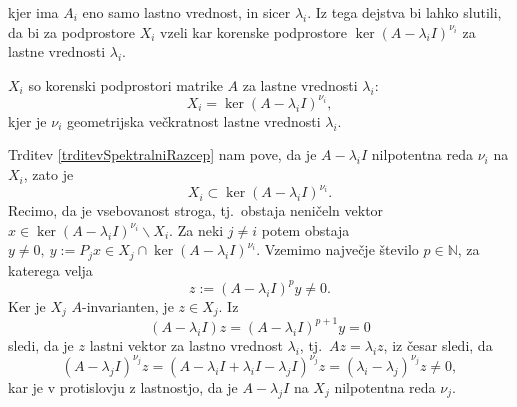 \documentclass[mat1]{fmfdelo}
\newcommand{\N}{\mathbb N}
\begin{document}
kjer ima $A_i$ eno samo lastno vrednost, in sicer $\lambda_i$. Iz tega dejstva bi lahko slutili, da bi za podprostore $X_i$ vzeli kar korenske podprostore $\ker (A - \lambda_i I)^{\nu_i}$ za lastne vrednosti $\lambda_i$.
\begin{trditev}
    $X_i$ so korenski podprostori matrike $A$ za lastne vrednosti $\lambda_i$:
    \begin{equation*}
        X_i = \ker (A - \lambda_i I)^{\nu_i},
    \end{equation*}
    kjer je $\nu_i$ geometrijska večkratnost lastne vrednosti $\lambda_i$.
\end{trditev}
\begin{dokaz}
    Trditev \ref{trditevSpektralniRazcep} nam pove, da je $A - \lambda_i I$ nilpotentna reda $\nu_i$ na $X_i$, zato je
    \begin{equation} \label{strogaVsebovanost}
        X_i \subset \ker (A - \lambda_i I)^{\nu_i}.
    \end{equation}
    Recimo, da je vsebovanost stroga, tj.\ obstaja neničeln vektor $x \in \ker (A - \lambda_i I)^{\nu_i} \backslash X_i$. Za neki $j \neq i$ potem obstaja $y \neq 0,\ y := P_j x \in X_j \cap \ker (A - \lambda_i I)^{\nu_i}$. Vzemimo največje število $p \in \N$, za katerega velja
    \begin{equation*}
        z := (A - \lambda_i I)^p y \neq 0.
    \end{equation*}
    Ker je $X_j$ $A$-invarianten, je $z \in X_j$. Iz
    \begin{equation*}
        (A - \lambda_i I) z = (A - \lambda_i I)^{p+1} y = 0
    \end{equation*}
    sledi, da je $z$ lastni vektor za lastno vrednost $\lambda_i$, tj.\ $A z = \lambda_i z$, iz česar sledi, da
    \begin{equation*}
        (A - \lambda_j I)^{\nu_j} z = \left(A - \lambda_i I + \lambda_i I - \lambda_j I\right)^{\nu_j} z = (\lambda_i - \lambda_j)^{\nu_j} z \neq 0,
    \end{equation*}
    kar je v protislovju z lastnostjo, da je $A - \lambda_j I$ na $X_j$ nilpotentna reda $\nu_j$.
\end{dokaz}
\end{document}
